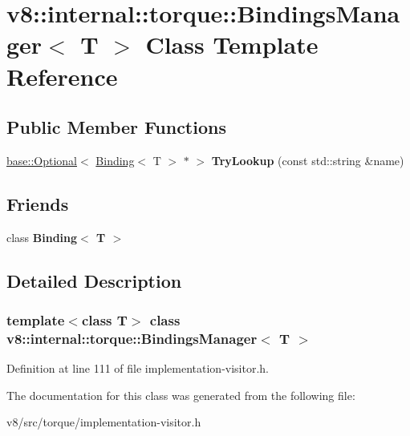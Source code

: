 \hypertarget{classv8_1_1internal_1_1torque_1_1BindingsManager}{}\section{v8\+:\+:internal\+:\+:torque\+:\+:Bindings\+Manager$<$ T $>$ Class Template Reference}
\label{classv8_1_1internal_1_1torque_1_1BindingsManager}
\subsection*{Public Member Functions}
\begin{DoxyCompactItemize}
\item 
\mbox{\label{classv8_1_1internal_1_1torque_1_1BindingsManager_a5e46b593f40ffc7edd91aee412dd1af4}} 
\mbox{\hyperlink{classv8_1_1base_1_1Optional}{base\+::\+Optional}}$<$ \mbox{\hyperlink{classv8_1_1internal_1_1torque_1_1Binding}{Binding}}$<$ T $>$ $\ast$ $>$ {\bfseries Try\+Lookup} (const std\+::string \&name)
\end{DoxyCompactItemize}
\subsection*{Friends}
\begin{DoxyCompactItemize}
\item 
\mbox{\label{classv8_1_1internal_1_1torque_1_1BindingsManager_a1b1431826f637f89cc1a0df85ca864e9}} 
class {\bfseries Binding$<$ T $>$}
\end{DoxyCompactItemize}


\subsection{Detailed Description}
\subsubsection*{template$<$class T$>$\newline
class v8\+::internal\+::torque\+::\+Bindings\+Manager$<$ T $>$}



Definition at line 111 of file implementation-\/visitor.\+h.



The documentation for this class was generated from the following file\+:\begin{DoxyCompactItemize}
\item 
v8/src/torque/implementation-\/visitor.\+h\end{DoxyCompactItemize}
